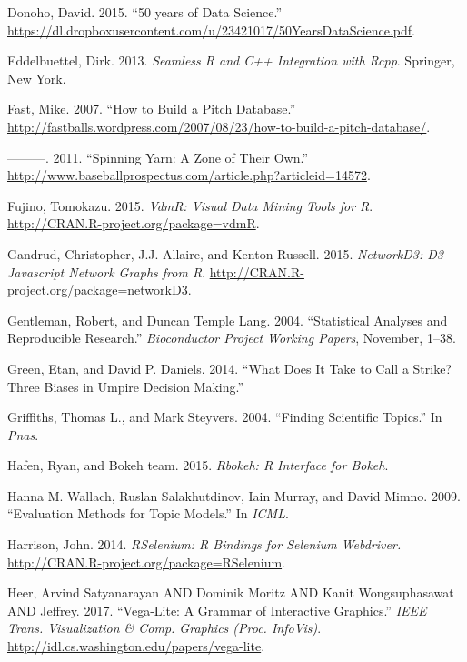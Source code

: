 \documentclass[12pt,]{isuthesis}
\begin{document}
\hypertarget{ref-Donoho:2015tu}{}
Donoho, David. 2015. ``50 years of Data Science.''
\url{https://dl.dropboxusercontent.com/u/23421017/50YearsDataScience.pdf}.

\hypertarget{ref-Rcpp}{}
Eddelbuettel, Dirk. 2013. \emph{Seamless R and C++ Integration with
Rcpp}. Springer, New York.

\hypertarget{ref-database}{}
Fast, Mike. 2007. ``How to Build a Pitch Database.''
\url{http://fastballs.wordpress.com/2007/08/23/how-to-build-a-pitch-database/}.

\hypertarget{ref-Strikezones}{}
---------. 2011. ``Spinning Yarn: A Zone of Their Own.''
\url{http://www.baseballprospectus.com/article.php?articleid=14572}.

\hypertarget{ref-vdmR}{}
Fujino, Tomokazu. 2015. \emph{VdmR: Visual Data Mining Tools for R}.
\url{http://CRAN.R-project.org/package=vdmR}.

\hypertarget{ref-networkD3}{}
Gandrud, Christopher, J.J. Allaire, and Kenton Russell. 2015.
\emph{NetworkD3: D3 Javascript Network Graphs from R}.
\url{http://CRAN.R-project.org/package=networkD3}.

\hypertarget{ref-Gentleman:Lang}{}
Gentleman, Robert, and Duncan Temple Lang. 2004. ``Statistical Analyses
and Reproducible Research.'' \emph{Bioconductor Project Working Papers},
November, 1--38.

\hypertarget{ref-bias}{}
Green, Etan, and David P. Daniels. 2014. ``What Does It Take to Call a
Strike? Three Biases in Umpire Decision Making.''

\hypertarget{ref-Griffiths}{}
Griffiths, Thomas L., and Mark Steyvers. 2004. ``Finding Scientific
Topics.'' In \emph{Pnas}.

\hypertarget{ref-rbokeh}{}
Hafen, Ryan, and Bokeh team. 2015. \emph{Rbokeh: R Interface for Bokeh}.

\hypertarget{ref-Wallach}{}
Hanna M. Wallach, Ruslan Salakhutdinov, Iain Murray, and David Mimno.
2009. ``Evaluation Methods for Topic Models.'' In \emph{ICML}.

\hypertarget{ref-RSelenium}{}
Harrison, John. 2014. \emph{RSelenium: R Bindings for Selenium
Webdriver.} \url{http://CRAN.R-project.org/package=RSelenium}.

\hypertarget{ref-vega-lite}{}
Heer, Arvind Satyanarayan AND Dominik Moritz AND Kanit Wongsuphasawat
AND Jeffrey. 2017. ``Vega-Lite: A Grammar of Interactive Graphics.''
\emph{IEEE Trans. Visualization \& Comp. Graphics (Proc. InfoVis)}.
\url{http://idl.cs.washington.edu/papers/vega-lite}.
\end{document}
